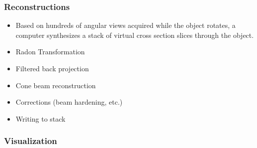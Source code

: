 \begin{frame}
  \frametitle{Reconstructions}
  \begin{itemize}
    \item Based on hundreds of angular views acquired while the object rotates, a computer synthesizes a stack of virtual cross section slices through the object.
    \item Radon Transformation
    \item Filtered back projection
    \item Cone beam reconstruction~\cite{Feldkamp1984}
    \item Corrections (beam hardening, etc.)
    \item Writing to stack
  \end{itemize}
\end{frame}

\begin{frame}
  \frametitle{Visualization}
\end{frame}

